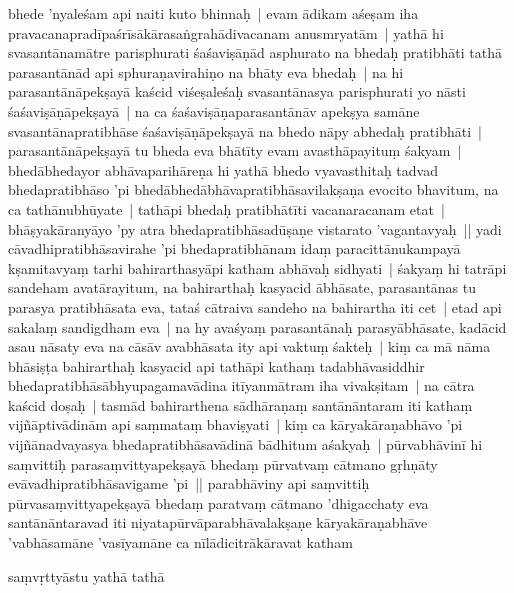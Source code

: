 \documentclass[article,12pt,a4paper]{memoir}%
\newcounter{parCount}
\begin{document}
	  
	  \pstart \leavevmode%
	bhede 'nyaleśam api naiti kuto bhinnaḥ | evam ādikam aśeṣam iha pravacanapradīpaśrīsākārasaṅgrahādivacanam anusmryatām | \label{thakur75-147.21} yathā hi svasantānamātre parisphurati śaśaviṣāṇād asphurato na bhedaḥ pratibhāti tathā parasantānād api sphuraṇavirahiṇo na bhāty eva bhedaḥ | na hi parasantānāpekṣayā kaścid viśeṣaleśaḥ svasantānasya parisphurati yo nāsti śaśaviṣāṇāpekṣayā | na ca śaśaviṣāṇaparasantānāv apekṣya samāne svasantānapratibhāse śaśaviṣāṇāpekṣayā na bhedo nāpy abhedaḥ pratibhāti | parasantānāpekṣayā tu bheda eva bhātīty evam avasthāpayituṃ śakyam | \label{thakur75-147.27} bhedābhedayor abhāvaparihāreṇa hi yathā bhedo vyavasthitaḥ tadvad bhedapratibhāso 'pi bhedābhedābhāvapratibhāsavilakṣaṇa evocito bhavitum, na ca tathānubhūyate | tathāpi bhedaḥ pratibhātīti vacanaracanam etat | bhāṣyakāranyāyo 'py atra bhedapratibhāsadūṣaṇe vistarato 'vagantavyaḥ || \label{thakur75-148.1} yadi cāvadhipratibhāsavirahe 'pi bhedapratibhānam idaṃ paracittānukampayā kṣamitavyaṃ tarhi bahirarthasyāpi katham abhāvaḥ sidhyati | śakyaṃ hi tatrāpi sandeham avatārayitum, na bahirarthaḥ kasyacid ābhāsate, parasantānas tu parasya pratibhāsata eva, tataś cātraiva sandeho na bahirartha iti cet | etad api sakalaṃ sandigdham eva | na hy avaśyaṃ parasantānaḥ parasyābhāsate, kadācid asau nāsaty eva na cāsāv avabhāsata ity api vaktuṃ śakteḥ | \label{thakur75-148.7} kiṃ ca mā nāma bhāsiṣṭa bahirarthaḥ kasyacid api tathāpi kathaṃ tadabhāvasiddhir bhedapratibhāsābhyupagamavādina itīyanmātram iha vivakṣitam | na cātra kaścid doṣaḥ | tasmād bahirarthena sādhāraṇaṃ santānāntaram iti kathaṃ vijñāptivādinām api saṃmataṃ bhaviṣyati | kiṃ ca kāryakāraṇabhāvo 'pi vijñānadvayasya bhedapratibhāsavādinā bādhitum aśakyaḥ | pūrvabhāvinī hi saṃvittiḥ parasaṃvittyapekṣayā bhedaṃ pūrvatvaṃ cātmano gṛhṇāty evāvadhipratibhāsavigame 'pi || \label{thakur75-148.13} parabhāviny api saṃvittiḥ pūrvasaṃvittyapekṣayā bhedaṃ paratvaṃ cātmano 'dhigacchaty eva santānāntaravad iti niyatapūrvāparabhāvalakṣaṇe kāryakāraṇabhāve 'vabhāsamāne 'vasīyamāne ca nīlādicitrākāravat katham
	{}
	\pend%
      

	  
	  \pstart \leavevmode%
	saṃvṛttyāstu yathā tathā 
	{}
	\pend%
      
\end{document}
